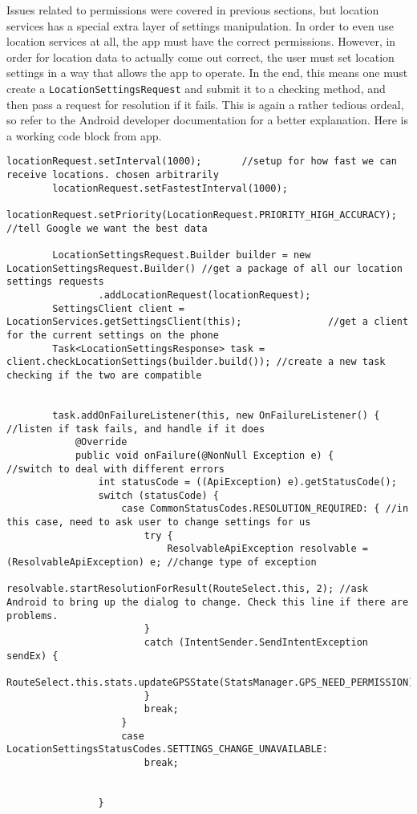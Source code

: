 Issues related to permissions were covered in previous sections, but location services has a special extra layer of settings manipulation. In order to even use location
services at all, the app must have the correct permissions. However, in order for location data to actually come out correct, the user must set location settings in a way
that allows the app to operate. In the end, this means one must create a \verb|LocationSettingsRequest| and submit it to a checking method, and then pass a request for
resolution if it fails. This is again a rather tedious ordeal, so refer to the Android developer documentation for a better explanation.\cite{googleLocationServices}
Here is a working code block from app.
\begin{verbatim}
locationRequest.setInterval(1000);       //setup for how fast we can receive locations. chosen arbitrarily
        locationRequest.setFastestInterval(1000);
        locationRequest.setPriority(LocationRequest.PRIORITY_HIGH_ACCURACY); //tell Google we want the best data

        LocationSettingsRequest.Builder builder = new LocationSettingsRequest.Builder() //get a package of all our location settings requests
                .addLocationRequest(locationRequest);
        SettingsClient client = LocationServices.getSettingsClient(this);               //get a client for the current settings on the phone
        Task<LocationSettingsResponse> task = client.checkLocationSettings(builder.build()); //create a new task checking if the two are compatible


        task.addOnFailureListener(this, new OnFailureListener() { //listen if task fails, and handle if it does
            @Override
            public void onFailure(@NonNull Exception e) {           //switch to deal with different errors
                int statusCode = ((ApiException) e).getStatusCode();
                switch (statusCode) {
                    case CommonStatusCodes.RESOLUTION_REQUIRED: { //in this case, need to ask user to change settings for us
                        try {
                            ResolvableApiException resolvable = (ResolvableApiException) e; //change type of exception
                            resolvable.startResolutionForResult(RouteSelect.this, 2); //ask Android to bring up the dialog to change. Check this line if there are problems.
                        }
                        catch (IntentSender.SendIntentException sendEx) {
                        RouteSelect.this.stats.updateGPSState(StatsManager.GPS_NEED_PERMISSION);
                        }
                        break;
                    }
                    case LocationSettingsStatusCodes.SETTINGS_CHANGE_UNAVAILABLE:
                        break;


                }
\end{verbatim}

